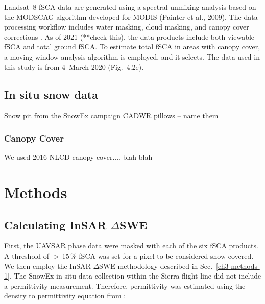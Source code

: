 Landsat~8 fSCA \citep{u.s.geologicalsurveyearthresourcesobservationandsciencecenterCollection1LandsatLevel32018} data are generated using a spectral unmixing analysis based on the MODSCAG algorithm developed for MODIS (Painter et al., 2009). The data processing workflow includes water masking, cloud masking, and canopy cover corrections \citep{selkowitzUSGSLandsatSnow2017, stillingerLandsatMODISVIIRS2023}. As of 2021 (**check this), the data products include both viewable fSCA and total ground fSCA. To estimate total fSCA in areas with canopy cover, a moving window analysis algorithm is employed, and it selects. The data used in this study is from 4~March 2020 (Fig.~4.2e).


\hypertarget{ch4-methods-8}{\subsection{In situ snow data}\label{ch4-methods-8}}

Snow pit from the SnowEx campaign
CADWR pillows -- name them

\hypertarget{ch4-methods-9}{\subsubsection{Canopy Cover}\label{ch4-methods-9}}

We used 2016 NLCD canopy cover.... blah blah

\hypertarget{ch4-methods}{\section{Methods}\label{ch4-methods}}
\hypertarget{ch4-methods-1}{\subsection{Calculating InSAR $\Delta$SWE}\label{ch4-methods-1}}


First, the UAVSAR phase data were masked with each of the six fSCA products. A threshold of $>$\,15\,\% fSCA was set for a pixel to be considered snow covered. We then employ the InSAR $\Delta$SWE methodology described in Sec.~\ref{ch3-methods-1}. The SnowEx in situ data collection within the Sierra flight line did not include a permittivity measurement. Therefore, permittivity was estimated using the density to permittivity equation from \cite{guneriussenInSAREstimationChanges2001}:

